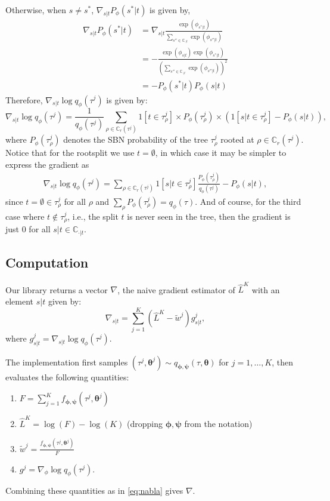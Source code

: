 \documentclass{article}
\newcommand{\bParam}{\bm{\theta}}
\begin{document}
Otherwise, when $s \not= s^*$, $\nabla_{s|t} P_{\phi}(s^*|t)$ is given by,
\begin{align*}
    \nabla_{s|t} P_{\phi}(s^*|t) &= \nabla_{s|t} \frac{\exp(\phi_{s^*|t})}{\sum\limits_{s'' \in \mathbb{C}_{.|t}} \exp(\phi_{s''|t})} \\
    &= - \frac{\exp(\phi_{s|t}) \exp(\phi_{s^*|t})}{\left(\sum\limits_{s'' \in \mathbb{C}_{.|t}} \exp(\phi_{s''|t})\right)^2} \\
    &= - P_{\phi}(s^*|t) P_{\phi}(s|t)
\end{align*}
Therefore, $\nabla_{s|t} \log q_{\phi}(\tau^j)$ is given by:
\begin{equation}
    \nabla_{s|t} \log q_{\phi}(\tau^j)
    = \frac{1}{q_{\phi}(\tau^j)} \sum\limits_{\rho \in \mathbb{C}_{r}(\tau^j)} 1[t \in \tau_{\rho}^j] \times P_{\phi}(\tau^j_{\rho}) \times \left(1[s|t \in \tau^j_{\rho}] - P_{\phi}(s|t)\right),
    \label{eq:gradLogQ}
\end{equation}
where $P_{\phi}(\tau_{\rho}^j)$ denotes the SBN probability of the tree $\tau^j_{\rho}$ rooted at $\rho \in \mathbb{C}_{r}(\tau^j)$.
Notice that for the rootsplit we use $t = \emptyset$, in which case it may be simpler to express the gradient as
\begin{align}
    \nabla_{s|t} \log q_{\phi}(\tau^j)
    = \sum\limits_{\rho \in \mathbb{C}_{r}(\tau^j)} 1[s|t \in \tau^j_{\rho}] \frac{P_{\phi}(\tau^j_{\rho})}{q_{\phi}(\tau^j)} - P_{\phi}(s|t),
    \label{eq:rootsplitGrad}
\end{align}
since $t = \emptyset \in \tau_{\rho}^j$ for all $\rho$ and $\sum_{\rho} P_{\phi}(\tau_{\rho}^j) = q_{\phi}(\tau)$.
And of course, for the third case where $t \notin \tau_{\rho}^j$, i.e., the split $t$ is never seen in the tree, then the gradient is just $0$ for all $s | t \in \mathbb{C}_{\cdot|t}$.


\subsection*{Computation}
Our library returns a vector $\nabla$, the naive gradient estimator of $\hat{L}^K$ with an element $s|t$ given by:
\begin{equation}\label{eq:nabla}
    \nabla_{s|t} = \sum\limits_{j=1}^{K} (\hat{L}^K - \tilde{w}^j) g_{s|t}^j,
\end{equation}
where $g_{s|t}^j = \nabla_{s|t} \log q_{\phi}(\tau^j)$.

The implementation first samples $(\tau^j, \bParam^j) \sim q_{\bm{\phi}, \bm{\psi}}(\tau, \bParam)$ for $j = 1, \ldots, K$, then evaluates the following quantities:
\begin{enumerate}
    \item $F = \sum_{j=1}^{K} f_{\bm{\phi},\bm{\psi}}(\tau^j, \bParam^j)$
    \item $\hat{L}^{K} = \log(F) - \log(K)$ (dropping $\bm{\phi}, \bm{\psi}$ from the notation)
    \item $\tilde{w}^j = \frac{f_{\bm{\phi},\bm{\psi}}(\tau^j, \bParam^j)}{F}$
    \item $g^j = \nabla_{\phi} \log q_{\phi}(\tau^j)$.
\end{enumerate}
Combining these quantities as in \eqref{eq:nabla} gives $\nabla$.
\end{document}
